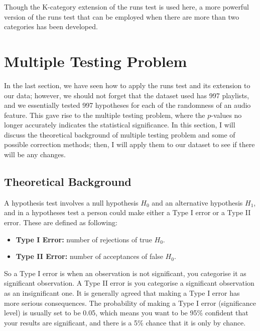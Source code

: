 \documentclass[12pt]{article}
\theoremstyle{plain}
\theoremstyle{definition}
\theoremstyle{remark}
\begin{document}
Though the K-category extension of the runs test is used here, a more powerful version\cite{3.4} of the runs test that can be employed when there are more than two categories has been developed. 





\newpage







\section{Multiple Testing Problem}
In the last section, we have seen how to apply the runs test and its extension to our data; however, we should not forget that the dataset used has 997 playlists, and we essentially tested 997 hypotheses for each of the randomness of an audio feature. This gave rise to the multiple testing problem, where the $p$-values no longer accurately indicates the statistical significance\cite{5.2}. In this section, I will discuss the theoretical background of multiple testing problem and some of possible correction methods; then, I will apply them to our dataset to see if there will be any changes.


\subsection{Theoretical Background}
A hypothesis test involves a null hypothesis $H_0$ and an alternative hypothesis $H_1$, and in a hypotheses test a person could make either a Type I error or a Type II error. These are defined as following\cite{5.2}:
\begin{itemize}
    \item \textbf{Type I Error:} number of rejections of true $H_0$.
    \item \textbf{Type II Error:} number of acceptances of false $H_0$.
\end{itemize}
So a Type I error is when an observation is not significant, you categorise it as significant observation. A Type II error is you categorise a significant observation as an insignificant one. It is generally agreed that making a Type I error has more serious consequences.\cite{5.2} The probability of making a Type I error (significance level) is usually set to be 0.05, which means you want to be 95\% confident that your results are significant, and there is a 5\% chance that it is only by chance.\cite{5.4}
\end{document}
